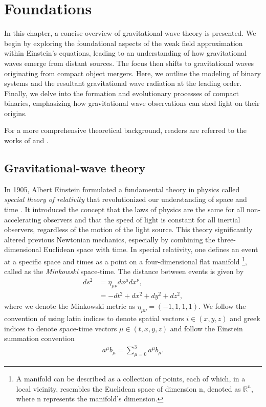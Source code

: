 \chapter{Foundations}

In this chapter, a concise overview of gravitational wave theory is presented. We begin by exploring the foundational aspects of the weak field approximation within Einstein's equations, leading to an understanding of how gravitational waves emerge from distant sources. The focus then shifts to gravitational waves originating from compact object mergers. Here, we outline the modeling of binary systems and the resultant gravitational wave radiation at the leading order. Finally, we delve into the formation and evolutionary processes of compact binaries, emphasizing how gravitational wave observations can shed light on their origins.

For a more comprehensive theoretical background, readers are referred to the works of  \cite{Maggiore:2008aaa} and \cite{Schutz2009-ie}.

\section{Gravitational-wave theory}

In 1905, Albert Einstein formulated a fundamental theory in physics called \textit{special theory of relativity} that revolutionized our understanding of space and time \cite{Einstein:1905vqn}. It introduced the concept that the laws of physics are the same for all non-accelerating observers and that the speed of light is constant for all inertial observers, regardless of the motion of the light source. This theory significantly altered previous Newtonian mechanics, especially by combining the three-dimensional Euclidean space with time. In special relativity, one defines an event at a specific space and times as a point on a four-dimensional flat manifold  \footnote{A manifold can be described as a collection of points, each of which, in a local vicinity, resembles the Euclidean space of dimension n, denoted as $\mathbb{R}^n$, where n represents the manifold's dimension.}, called as the \textit{Minkowski} space-time. The distance between events is given by 
\begin{align}
    ds^2 &= \eta_{\mu\nu}dx^{\mu}dx^{\nu}, \\
         &= -dt^2 + dx^2 + dy^2 + dz^2, 
\end{align}
where we denote the Minkowski metric as $\eta_{\mu\nu} = (-1,1,1,1)$. We follow the convention of using latin indices to denote spatial vectors $i \in (x,y,z)$ and greek indices to denote space-time vectors $\mu \in (t, x, y, z)$ and follow the Einstein summation convention
\begin{align}
    a^{\mu}b_{\mu} = \sum_{\mu = 0}^{3} a^{\mu}b_{\mu}.
\end{align}

